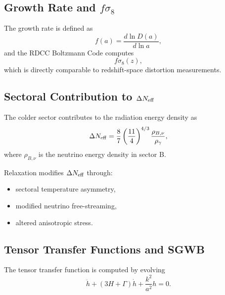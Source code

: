 \documentclass[11pt,a4paper]{article}
\begin{document}
\subsection{Growth Rate and \texorpdfstring{\(f\sigma_8\)}{f sigma 8}}

The growth rate is defined as
\begin{equation}
f(a) = \frac{d\ln D(a)}{d\ln a},
\end{equation}
and the RDCC Boltzmann Code computes
\begin{equation}
f\sigma_8(z),
\end{equation}
which is directly comparable to redshift-space distortion measurements.

\subsection{Sectoral Contribution to \texorpdfstring{\(\Delta N_{\rm eff}\)}{Delta N eff}}

The colder sector contributes to the radiation energy density as
\begin{equation}
\Delta N_{\rm eff} =
\frac{8}{7}\left(\frac{11}{4}\right)^{4/3}
\frac{\rho_{B,\nu}}{\rho_{\gamma}},
\end{equation}
where $\rho_{B,\nu}$ is the neutrino energy density in sector B.

Relaxation modifies $\Delta N_{\rm eff}$ through:

\begin{itemize}
\item sectoral temperature asymmetry,
\item modified neutrino free-streaming,
\item altered anisotropic stress.
\end{itemize}

\subsection{Tensor Transfer Functions and SGWB}

The tensor transfer function is computed by evolving
\begin{equation}
\ddot{h} + (3H + \Gamma)\dot{h} + \frac{k^2}{a^2}h = 0.
\end{equation}
\end{document}
